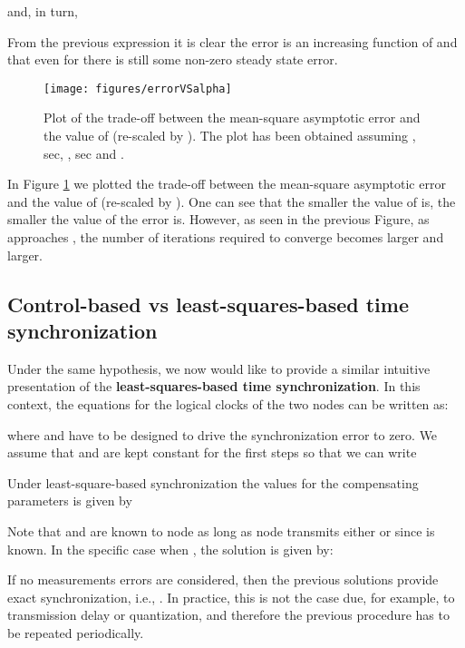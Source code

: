 \documentclass[english,a4paper,10pt,final]{article}
\numberwithin{equation}{section}
\numberwithin{figure}{section}
\begin{document}
and, in turn,

From the previous expression it is clear the error is an increasing function of  and that even for  there is still some non-zero steady state error.


\begin{figure} 
\center
\texttt{[image: figures/errorVSalpha]} 
\caption{\label{fig:errorVSalpha} Plot of the trade-off between the mean-square asymptotic error and the value of  (re-scaled by ). The plot has been obtained assuming , sec, , sec and .}
\end{figure}

In Figure \ref{fig:errorVSalpha}  we plotted the trade-off between the mean-square asymptotic error and the value of  (re-scaled by ). One can see that the smaller the value of  is, the smaller the value of the error is. However, as seen in the previous Figure, as  approaches , the number of iterations required to converge becomes larger and larger. 


\subsection{Control-based vs least-squares-based time synchronization}
\label{subsec:control_vs_least_squares}


Under the same hypothesis, we now would like to provide a similar intuitive presentation of the \textbf{least-squares-based time synchronization}.  In this context, the equations for the logical clocks of the two nodes can be written as:


where  and   have to be designed to drive the synchronization error  to zero. We assume that  and  are kept constant for the first  steps so that we can write

Under least-square-based synchronization the values for the compensating parameters is given by

Note that  and  are known to node  as long as node  transmits either  or  since  is known. In the specific case when , the solution is given by:

If no measurements errors are considered, then the previous solutions provide exact synchronization, i.e., . In practice, this is not the case due, for example, to transmission delay or quantization, and therefore the previous procedure has to be repeated periodically. 
\end{document}
